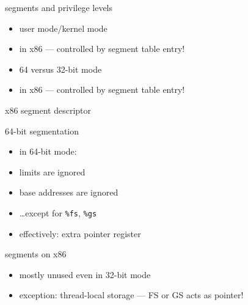 \begin{frame}{segments and privilege levels}
    \begin{itemize}
    \item user mode/kernel mode
    \item in x86 --- controlled by segment table entry!
    \item 64 versus 32-bit mode
    \item in x86 --- controlled by segment table entry!
    \end{itemize}
\end{frame}

\begin{frame}{x86 segment descriptor}
\vspace{-.25cm}
\end{frame}

\begin{frame}{64-bit segmentation}
\begin{itemize}
\item in 64-bit mode:
\item limits are ignored
\item base addresses are ignored
\item \ldots except for {\tt \%fs}, {\tt \%gs}
\item effectively: extra pointer register
\end{itemize}
\end{frame}

\begin{frame}{segments on x86}
\begin{itemize}
\item mostly unused even in 32-bit mode
\item exception: thread-local storage --- FS or GS acts as pointer!
\end{itemize}
\end{frame}

